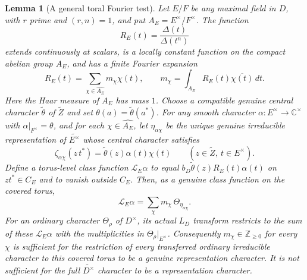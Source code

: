 \documentclass[11pt]{article}
\theoremstyle{plain}
\newtheorem{lemma}[theorem]{Lemma}
\theoremstyle{definition}
\begin{document}
\begin{lemma}[A general toral Fourier test]\label{lem:toral-Fourier}
Let $E/F$ be any maximal field in $D$, with $r$ prime and
$(r,n)=1$, and put $A_E=E^\times/F^\times$.  The function
\[
 R_E(t)=\frac{\Delta(t)}{\Delta(t^n)}
\]
extends continuously at scalars, is a locally constant function
on the compact abelian group $A_E$, and has a finite Fourier expansion
\begin{equation}\label{eq:R-Fourier}
 R_E(t)=\sum_{\chi\in\widehat{A_E}}m_\chi\chi(t),
 \qquad
 m_\chi=\int_{A_E}R_E(t)\overline{\chi(t)}\,dt.
\end{equation}
Here the Haar measure of $A_E$ has mass $1$.
Choose a compatible genuine central character
$\widetilde\theta$ of $\widetilde Z$ and set
$\theta(a)=\widetilde\theta(a^*)$.  For any smooth character
$\alpha:E^\times\to\mathbb C^\times$ with
$\alpha|_{F^\times}=\theta$, and for each $\chi\in\widehat{A_E}$,
let $\eta_{\alpha\chi}$ be the unique genuine irreducible
representation of $\widetilde{E^\times}$ whose central character
satisfies
\[
 \zeta_{\alpha\chi}(z\,t^*)=
 \widetilde\theta(z)\alpha(t)\chi(t)
 \qquad(z\in\widetilde Z,\ t\in E^\times).
\]
Define a torus-level class function $\mathcal L_E\alpha$ to equal
$b_D\widetilde\theta(z)R_E(t)\alpha(t)$ on $z t^*\in C_E$
and to vanish outside $C_E$.  Then, as a genuine class function
on the \emph{covered torus},
\begin{equation}\label{eq:toral-branch}
 \mathcal L_E\alpha
 =\sum_\chi m_\chi\,\Theta_{\eta_{\alpha\chi}}.
\end{equation}
For an ordinary character $\Theta_\rho$ of $D^\times$,
its actual $L_D$ transform restricts to the sum of these
$\mathcal L_E\alpha$ with the multiplicities in
$\Theta_\rho|_{E^\times}$.
Consequently $m_\chi\in\mathbb Z_{\geq0}$ for every $\chi$
is sufficient for the restriction of every transferred ordinary
irreducible character to this covered torus to be a genuine
representation character.  It is not sufficient for the full
$\widetilde{D^\times}$ character to be a representation character.
\end{lemma}
\end{document}
